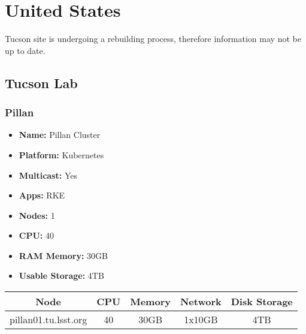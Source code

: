 \newpage
\section{United States}
\vspace*{-\baselineskip}
Tucson site is undergoing a rebuilding process, therefore information may not be up to date.
\subsection{Tucson Lab}
\subsubsection{Pillan}
\vspace*{-\baselineskip}
\begin{itemize}
  \itemsep0em 
  \item \textbf{Name:}       Pillan Cluster
  \item \textbf{Platform:}   Kubernetes
  \item \textbf{Multicast:}  Yes
  \item \textbf{Apps:}       RKE
  \item \textbf{Nodes:}      1
  \item \textbf{CPU:}        40
  \item \textbf{RAM Memory:} 30GB
  \item \textbf{Usable Storage:} 4TB
\end{itemize}
\vspace*{-\baselineskip}
\begin{center}
  \small
  \begin{tabular}{||c c c c c||}
    \hline
    \textbf{Node} & \textbf{CPU} & \textbf{Memory} & \textbf{Network} & \textbf{Disk Storage} \\ [0.5ex]
    \hline
    pillan01.tu.lsst.org & 40 & 30GB & 1x10GB & 4TB \\
    \hline
  \end{tabular}
\end{center}
\vspace*{-\baselineskip}
